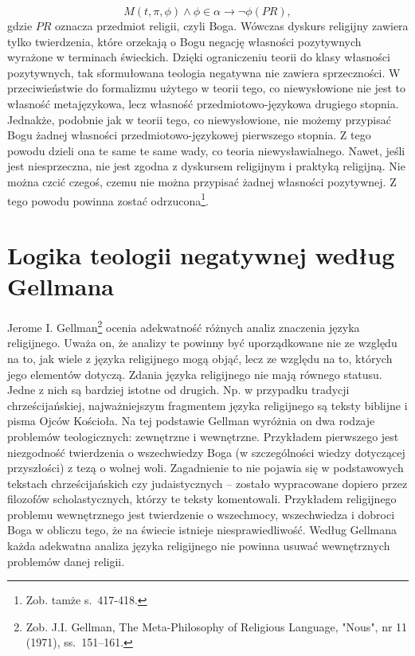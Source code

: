 \begin{equation}\label{boch2}
   M(t, \pi, \phi) \land
\phi \in \alpha
\to \neg \phi (PR),
\end{equation}
gdzie $PR$ oznacza przedmiot religii, czyli Boga. Wówczas dyskurs
religijny zawiera tylko twierdzenia, które orzekają o Bogu negację
własności pozytywnych wyrażone w terminach świeckich. Dzięki
ograniczeniu teorii do klasy własności pozytywnych, tak sformułowana
teologia negatywna nie zawiera sprzeczności. W przeciwieństwie do
formalizmu użytego w teorii tego, co niewysłowione nie jest to własność
metajęzykowa, lecz własność przedmiotowo-językowa drugiego stopnia.
Jednakże, podobnie jak w teorii tego, co niewysłowione, nie możemy
przypisać Bogu żadnej własności przedmiotowo-językowej pierwszego
stopnia. Z tego powodu dzieli ona te same te same wady, co teoria
niewysławialnego. Nawet, jeśli jest niesprzeczna, nie jest zgodna z
dyskursem religijnym i praktyką religijną. Nie można czcić czegoś,
czemu nie można przypisać żadnej własności pozytywnej. Z tego powodu
powinna zostać odrzucona\footnote{Zob. tamże s.~417-418. }.

\clearpage
\section{Logika teologii negatywnej według Gellmana}

Jerome I. Gellman\footnote{Zob. J.I. Gellman, The Meta-Philosophy of Religious Language,
"Nous", nr 11 (1971), ss.~151--161.}
 ocenia adekwatność różnych analiz znaczenia języka religijnego.
Uważa on, że analizy te powinny być uporządkowane nie ze względu na to,
jak wiele z języka religijnego mogą objąć, lecz ze względu na to,
których jego elementów dotyczą. Zdania języka religijnego nie mają
równego statusu. Jedne z nich są bardziej istotne od drugich. Np. w
przypadku tradycji chrześcijańskiej, najważniejszym fragmentem języka
religijnego są teksty biblijne i pisma Ojców Kościoła. Na tej podstawie
Gellman wyróżnia on dwa rodzaje problemów teologicznych: zewnętrzne i
wewnętrzne. Przykładem pierwszego jest niezgodność twierdzenia o
wszechwiedzy Boga (w szczególności wiedzy dotyczącej przyszłości) z
tezą o wolnej woli. Zagadnienie to nie pojawia się w podstawowych
tekstach chrześcijańskich czy judaistycznych -- zostało wypracowane
dopiero przez filozofów scholastycznych, którzy te teksty komentowali.
Przykładem religijnego problemu wewnętrznego jest twierdzenie o
wszechmocy, wszechwiedza i dobroci Boga w obliczu tego, że na świecie
istnieje niesprawiedliwość. Według Gellmana każda adekwatna analiza
języka religijnego nie powinna usuwać wewnętrznych problemów danej
religii.

